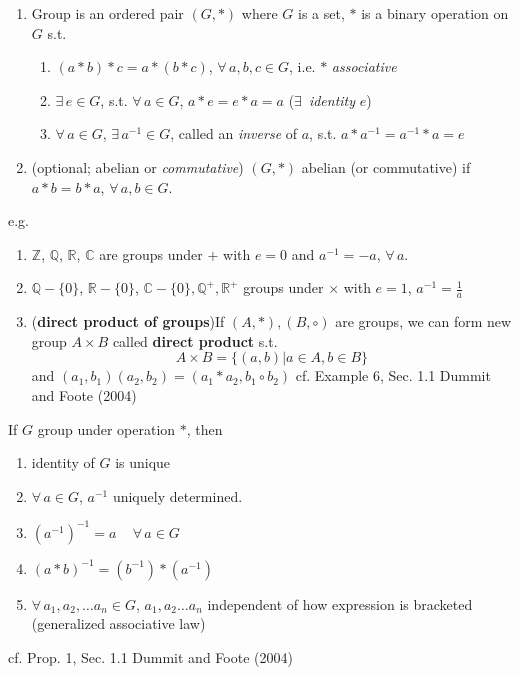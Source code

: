 \begin{definition}[Group]
\begin{enumerate}
\item Group is an ordered pair $(G, *)$ where $G$ is a set, $*$ is a binary operation on $G$ s.t. 
\begin{enumerate}
\item $(a*b)*c = a*(b*c)$, $\forall \, a,b ,c \in G$, i.e. $*$ \emph{associative}
\item $\exists \, e \in G$, s.t. $\forall \, a\in G$, $a*e = e*a = a$  ($\exists \, $ \emph{identity} $e$)
\item $\forall \, a\in G$, $\exists \, a^{-1}\in G$, called an \emph{inverse} of $a$, s.t. $a*a^{-1} = a^{-1} * a = e$
\end{enumerate}
\item (optional; abelian or \emph{commutative}) $(G,*)$ abelian (or commutative) if $a*b = b*a$, $\forall \, a,b \in G$. 
\end{enumerate}
\end{definition}
e.g.
\begin{enumerate}
\item  $\mathbb{Z}$, $\mathbb{Q}$, $\mathbb{R}$, $\mathbb{C}$ are groups under $+$ with $e=0$ and $a^{-1} = -a$, $\forall \, a$. 
\item $\mathbb{Q} - \lbrace 0 \rbrace$, $\mathbb{R} - \lbrace 0 \rbrace$, $\mathbb{C} - \lbrace 0 \rbrace, \mathbb{Q}^+, \mathbb{R}^+$ groups under $\times$ with $e=1$, $a^{-1} = \frac{1}{a}$
\item (\textbf{direct product of groups})If $(A,*), (B,\circ)$ are groups, we can form new group $A\times B$ called \textbf{direct product} s.t.
\[
A \times B = \lbrace (a,b) | a\in A, b\in B\rbrace
\] and $(a_1,b_1)(a_2,b_2) = (a_1*a_2, b_1 \circ b_2)$ cf. Example 6, Sec. 1.1 Dummit and Foote (2004) \cite{agat:DuFo2003}
\end{enumerate}

\begin{proposition}
If $G$ group under operation $*$, then 
\begin{enumerate}
\item identity of $G$ is unique
\item $\forall \, a \in G$, $a^{-1}$ uniquely determined.
\item $(a^{-1})^{-1} = a \quad \, \forall \, a \in G$ 
\item $(a*b)^{-1} = (b^{-1}) * (a^{-1})$ 
\item $\forall \, a_1, a_2, \dots a_n \in G$, $a_1 , a_2 \dots a_n $ independent of how expression is bracketed (generalized associative law)
\end{enumerate}
\end{proposition}
cf. Prop. 1, Sec. 1.1 Dummit and Foote (2004)\cite{agat:DuFo2003}

